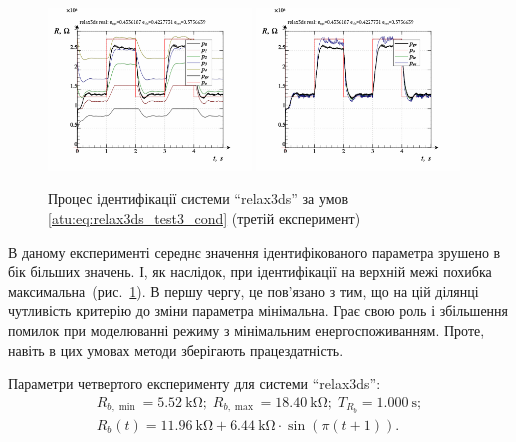 \begin{figure}[htb!]
  \centerline{
    \includegraphics[width=0.48\textwidth]{p/relax3ds_read_id2_2-p_p.png}
    \hfill
    \includegraphics[width=0.48\textwidth]{p/relax3ds_read_id2_2-p_pp.png}
  }
\caption{Процес ідентифікації системи ``relax3ds'' за умов \ref{atu:eq:relax3ds_test3_cond} (третій експеримент)}
  \label{atu:f:relax3ds_id_2}
\end{figure}

В даному експерименті середнє значення ідентифікованого
параметра зрушено в бік більших значень. І, як
наслідок, при ідентифікації на верхній межі похибка
максимальна~(рис.~\ref{atu:f:relax3ds_id_2}). В першу чергу, це пов'язано з
тим, що на цій ділянці чутливість критерію до зміни параметра
мінімальна. Грає свою роль і збільшення помилок при моделюванні
режиму з мінімальним енергоспоживанням. Проте, навіть в цих
умовах методи зберігають працездатність.


Параметри четвертого експерименту для системи ``relax3ds'':
%
\begin{equation}
  \begin{array}{c}
    R_{b,\min} = \SI{5.52}{\kilo\ohm};
    \;
    R_{b,\max} = \SI{18.40}{\kilo\ohm};
    \;
    T_{R_b} = \SI{1.000}{\second};
  \\
    R_b(t) = \SI{11.96}{\kilo\ohm} + \SI{6.44}{\kilo\ohm} \cdot \sin( \pi ( t + 1 ) ).
  \end{array}
  \label{atu:eq:relax3ds_test4_cond}
\end{equation}

